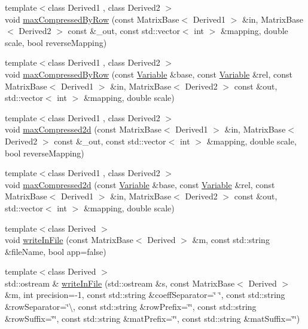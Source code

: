 \begin{DoxyCompactItemize}
\item 
{\footnotesize template$<$class Derived1 , class Derived2 $>$ }\\void \hyperlink{namespaceocra_1_1utils_a6216ad7fe2fb3ce0e894167f8f7d08b8}{max\+Compressed\+By\+Row} (const Matrix\+Base$<$ Derived1 $>$ \&in, Matrix\+Base$<$ Derived2 $>$ const \&\+\_\+out, const std\+::vector$<$ int $>$ \&mapping, double scale, bool reverse\+Mapping)
\item 
{\footnotesize template$<$class Derived1 , class Derived2 $>$ }\\void \hyperlink{namespaceocra_1_1utils_a0d2b985e493c0d62782921b92d0f92a9}{max\+Compressed\+By\+Row} (const \hyperlink{classocra_1_1Variable}{Variable} \&base, const \hyperlink{classocra_1_1Variable}{Variable} \&rel, const Matrix\+Base$<$ Derived1 $>$ \&in, Matrix\+Base$<$ Derived2 $>$ const \&out, std\+::vector$<$ int $>$ \&mapping, double scale)
\item 
{\footnotesize template$<$class Derived1 , class Derived2 $>$ }\\void \hyperlink{namespaceocra_1_1utils_ac4a24bd4a452b6c09129dcf5b7f620a2}{max\+Compressed2d} (const Matrix\+Base$<$ Derived1 $>$ \&in, Matrix\+Base$<$ Derived2 $>$ const \&\+\_\+out, const std\+::vector$<$ int $>$ \&mapping, double scale, bool reverse\+Mapping)
\item 
{\footnotesize template$<$class Derived1 , class Derived2 $>$ }\\void \hyperlink{namespaceocra_1_1utils_ab1811bfb0b7d5ab451e9fea88093027e}{max\+Compressed2d} (const \hyperlink{classocra_1_1Variable}{Variable} \&base, const \hyperlink{classocra_1_1Variable}{Variable} \&rel, const Matrix\+Base$<$ Derived1 $>$ \&in, Matrix\+Base$<$ Derived2 $>$ const \&out, std\+::vector$<$ int $>$ \&mapping, double scale)
\item 
{\footnotesize template$<$class Derived $>$ }\\void \hyperlink{namespaceocra_1_1utils_a3f12986cd4d4a40293f6003d9a86a45c}{write\+In\+File} (const Matrix\+Base$<$ Derived $>$ \&m, const std\+::string \&file\+Name, bool app=false)
\item 
{\footnotesize template$<$class Derived $>$ }\\std\+::ostream \& \hyperlink{namespaceocra_1_1utils_ac3e209e5a700c28cc6e38d79113017f2}{write\+In\+File} (std\+::ostream \&s, const Matrix\+Base$<$ Derived $>$ \&m, int precision=-\/1, const std\+::string \&coeff\+Separator=\char`\"{} \char`\"{}, const std\+::string \&row\+Separator=\char`\"{}\textbackslash{}, const std\+::string \&row\+Prefix=\char`\"{}\char`\"{}, const std\+::string \&row\+Suffix=\char`\"{}\char`\"{}, const std\+::string \&mat\+Prefix=\char`\"{}\char`\"{}, const std\+::string \&mat\+Suffix=\char`\"{}\char`\"{})

\end{DoxyCompactItemize}
